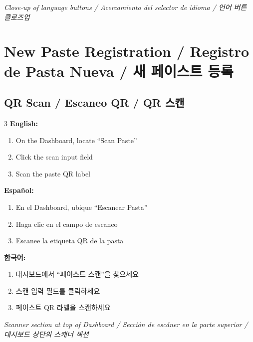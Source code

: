 \documentclass[12pt,a4paper]{article}
\begin{document}
\begin{photobox}
\centering
\vspace{2cm}
\textit{Close-up of language buttons / Acercamiento del selector de idioma / 언어 버튼 클로즈업}
\vspace{0.5cm}
\end{photobox}

\section{New Paste Registration / Registro de Pasta Nueva / 새 페이스트 등록}

\subsection{QR Scan / Escaneo QR / QR 스캔}

\begin{multicols}{3}
\textbf{English:}
\begin{enumerate}[leftmargin=*]
\item On the Dashboard, locate ``Scan Paste''
\item Click the scan input field
\item Scan the paste QR label
\end{enumerate}

\columnbreak
\textbf{Español:}
\begin{enumerate}[leftmargin=*]
\item En el Dashboard, ubique ``Escanear Pasta''
\item Haga clic en el campo de escaneo
\item Escanee la etiqueta QR de la pasta
\end{enumerate}

\columnbreak
\textbf{한국어:}
\begin{enumerate}[leftmargin=*]
\item 대시보드에서 ``페이스트 스캔''을 찾으세요
\item 스캔 입력 필드를 클릭하세요
\item 페이스트 QR 라벨을 스캔하세요
\end{enumerate}
\end{multicols}

\begin{photobox}
\centering
\vspace{2.5cm}
\textit{Scanner section at top of Dashboard / Sección de escáner en la parte superior / 대시보드 상단의 스캐너 섹션}
\vspace{0.5cm}
\end{photobox}
\end{document}
